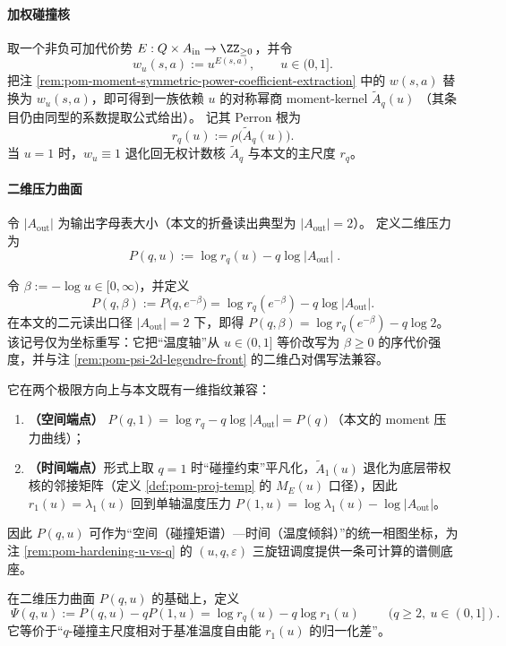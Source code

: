 \paragraph{加权碰撞核}
取一个非负可加代价势 \(E:Q\times A_{\mathrm{in}}\to\ZZ_{\ge 0}\)，并令
\[
w_u(s,a):=u^{E(s,a)},\qquad u\in(0,1].
\]
把注 \ref{rem:pom-moment-symmetric-power-coefficient-extraction} 中的 \(w(s,a)\) 替换为 \(w_u(s,a)\)，即可得到一族依赖 \(u\) 的对称幂商 moment-kernel
\(
\widetilde A_q(u)
\)
（其条目仍由同型的系数提取公式给出）。
记其 Perron 根为
\[
r_q(u):=\rho\!\bigl(\widetilde A_q(u)\bigr).
\]
当 \(u=1\) 时，\(w_u\equiv 1\) 退化回无权计数核 \(\widetilde A_q\) 与本文的主尺度 \(r_q\)。

\paragraph{二维压力曲面}
令 \(|A_{\mathrm{out}}|\) 为输出字母表大小（本文的折叠读出典型为 \(|A_{\mathrm{out}}|=2\)）。
定义二维压力为
\[
\boxed{\;
P(q,u):=\log r_q(u)-q\log|A_{\mathrm{out}}|\;}.
\]
\begin{remark}[温度参数的重参数化：\texorpdfstring{$u=e^{-\beta}$}{u=exp(-beta)} 与压力面 \texorpdfstring{$P(q,\beta)$}{P(q,beta)}]\label{rem:pom-pressure-beta-reparam}
令 \(\beta:=-\log u\in[0,\infty)\)，并定义
\[
P(q,\beta):=P\!\bigl(q,e^{-\beta}\bigr)=\log r_q(e^{-\beta})-q\log|A_{\mathrm{out}}|.
\]
在本文的二元读出口径 \(|A_{\mathrm{out}}|=2\) 下，即得 \(P(q,\beta)=\log r_q(e^{-\beta})-q\log 2\)。
该记号仅为坐标重写：它把“温度轴”从 \(u\in(0,1]\) 等价改写为 \(\beta\ge 0\) 的序代价强度，并与注 \ref{rem:pom-psi-2d-legendre-front} 的二维凸对偶写法兼容。
\end{remark}
它在两个极限方向上与本文既有一维指纹兼容：
\begin{enumerate}
  \item \textbf{（空间端点）} \(P(q,1)=\log r_q-q\log|A_{\mathrm{out}}|=P(q)\)（本文的 moment 压力曲线）；
  \item \textbf{（时间端点）}形式上取 \(q=1\) 时“碰撞约束”平凡化，\(\widetilde A_1(u)\) 退化为底层带权核的邻接矩阵（定义 \ref{def:pom-proj-temp} 的 \(M_E(u)\) 口径），因此 \(r_1(u)=\lambda_1(u)\) 回到单轴温度压力 \(P(1,u)=\log\lambda_1(u)-\log|A_{\mathrm{out}}|\)。
\end{enumerate}
因此 \(P(q,u)\) 可作为“空间（碰撞矩谱）—时间（温度倾斜）”的统一相图坐标，为注 \ref{rem:pom-hardening-u-vs-q} 的 \((u,q,\varepsilon)\) 三旋钮调度提供一条可计算的谱侧底座。

\begin{definition}\label{def:pom-psi-mixed-pressure}
在二维压力曲面 \(P(q,u)\) 的基础上，定义
\[
\boxed{\;
\Psi(q,u):=P(q,u)-qP(1,u)
=\log r_q(u)-q\log r_1(u)\;}
\qquad(q\ge 2,\ u\in(0,1]).
\]
它等价于“\(q\)-碰撞主尺度相对于基准温度自由能 \(r_1(u)\) 的归一化差”。
\end{definition}

